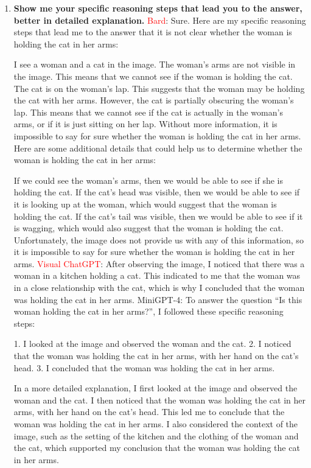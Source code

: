 \begin{enumerate}
    Without more information, it is impossible to say for sure whether the woman is holding the cat in her arms.
    \subitem \textcolor{red}{Visual ChatGPT}: Yes, the woman is holding the cat in her arms.
    \subitem MiniGPT-4: Yes, the woman is holding the cat in her arms.
    \item \textbf{Show me your specific reasoning steps that lead you to the answer, better in detailed explanation.}
    \subitem \textcolor{Red}{Bard}: Sure. Here are my specific reasoning steps that lead me to the answer that it is not clear whether the woman is holding the cat in her arms:

    I see a woman and a cat in the image.
    The woman's arms are not visible in the image. This means that we cannot see if the woman is holding the cat.
    The cat is on the woman's lap. This suggests that the woman may be holding the cat with her arms.
    However, the cat is partially obscuring the woman's lap. This means that we cannot see if the cat is actually in the woman's arms, or if it is just sitting on her lap.
    Without more information, it is impossible to say for sure whether the woman is holding the cat in her arms.
    Here are some additional details that could help us to determine whether the woman is holding the cat in her arms:
    
    If we could see the woman's arms, then we would be able to see if she is holding the cat.
    If the cat's head was visible, then we would be able to see if it is looking up at the woman, which would suggest that the woman is holding the cat.
    If the cat's tail was visible, then we would be able to see if it is wagging, which would also suggest that the woman is holding the cat.
    Unfortunately, the image does not provide us with any of this information, so it is impossible to say for sure whether the woman is holding the cat in her arms.
    \subitem \textcolor{red}{Visual ChatGPT}: After observing the image, I noticed that there was a woman in a kitchen holding a cat. This indicated to me that the woman was in a close relationship with the cat, which is why I concluded that the woman was holding the cat in her arms.
    \subitem MiniGPT-4: To answer the question “Is this woman holding the cat in her arms?”, I followed these specific reasoning steps:

    1. I looked at the image and observed the woman and the cat.
    2. I noticed that the woman was holding the cat in her arms, with her hand on the cat’s head.
    3. I concluded that the woman was holding the cat in her arms.
    
    In a more detailed explanation, I first looked at the image and observed the woman and the cat. I then noticed that the woman was holding the cat in her arms, with her hand on the cat’s head. This led me to conclude that the woman was holding the cat in her arms. I also considered the context of the image, such as the setting of the kitchen and the clothing of the woman and the cat, which supported my conclusion that the woman was holding the cat in her arms.
\end{enumerate}